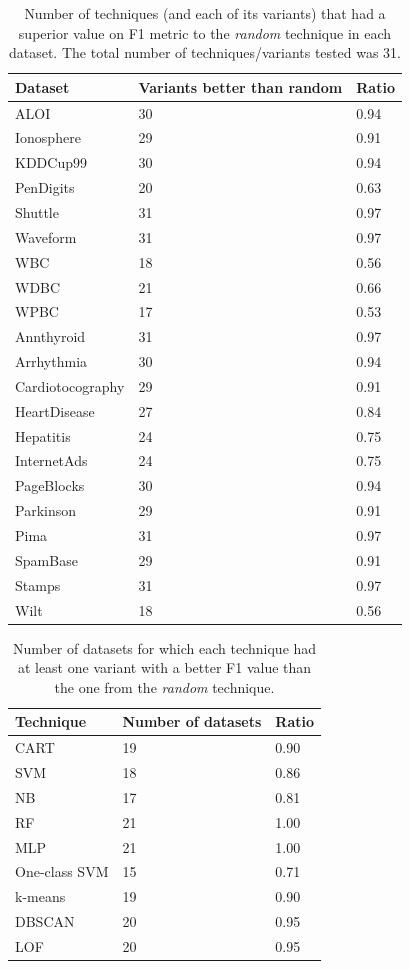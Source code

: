\begin{table}[!ht]
	\centering
	\caption{Number of techniques (and each of its variants) that had a superior value on F1 metric to the \textit{random} technique in each dataset. The total number of techniques/variants tested was 31.}
	\label{tab:better_than_random_datasets}
	\begin{tabular}{@{}lll@{}}
		\toprule
		\textbf{Dataset} & \textbf{Variants better than random} & \textbf{Ratio} \\ \midrule
		ALOI & 30 & 0.94 \\
		Ionosphere & 29 & 0.91 \\
		KDDCup99 & 30 & 0.94 \\
		PenDigits & 20 & 0.63 \\
		Shuttle & 31 & 0.97 \\
		Waveform & 31 & 0.97 \\
		WBC & 18 & 0.56 \\
		WDBC & 21 & 0.66 \\
		WPBC & 17 & 0.53 \\
		Annthyroid & 31 & 0.97 \\
		Arrhythmia & 30 & 0.94 \\
		Cardiotocography & 29 & 0.91 \\
		HeartDisease & 27 & 0.84 \\
		Hepatitis & 24 & 0.75 \\
		InternetAds & 24 & 0.75 \\
		PageBlocks & 30 & 0.94 \\
		Parkinson & 29 & 0.91 \\
		Pima & 31 & 0.97 \\
		SpamBase & 29 & 0.91 \\
		Stamps & 31 & 0.97 \\
		Wilt & 18 & 0.56 \\ \bottomrule
	\end{tabular}
\end{table}

\begin{table}[!ht]
	\centering
	\caption{Number of datasets for which each technique had at least one variant with a better F1 value than the one from the \textit{random} technique.}
	\label{tab:better_than_random_algorithms}
	\begin{tabular}{@{}lll@{}}
		\toprule
		\textbf{Technique} & \textbf{Number of datasets} & \textbf{Ratio} \\ \midrule
		CART & 19 & 0.90 \\
		SVM & 18 & 0.86 \\
		NB & 17 & 0.81 \\
		RF & 21 & 1.00 \\
		MLP & 21 & 1.00 \\
		One-class SVM & 15 & 0.71 \\
		k-means & 19 & 0.90 \\
		DBSCAN & 20 & 0.95 \\
		LOF & 20 & 0.95 \\ \bottomrule
	\end{tabular}\
\end{table}

